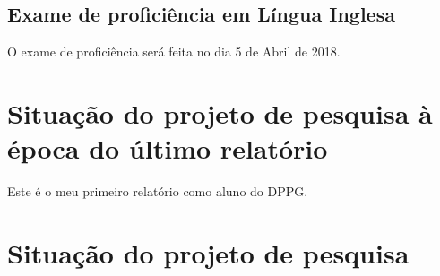 \documentclass[a4paper, 11pt]{article}
\begin{document}
\subsection{Exame de profici\^encia em L\'ingua Inglesa}

O exame de proficiência será feita no dia 5 de Abril de 2018.

\section{Situação do projeto de pesquisa à época do último relatório}
Este é o meu primeiro relatório como aluno do DPPG.

\section{Situa\c{c}\~ao do projeto de pesquisa}
\end{document}
